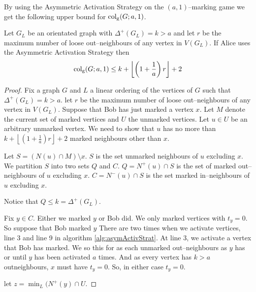     By using the Asymmetric Activation Strategy on the $(a,1)$--marking game we get the following upper bound for $\operatorname{col_g}(G;a,1)$.

\begin{theorem}  %
    Let $G_L$ be an orientated graph with $\Delta^+(G_L)=k>a$ and let $r$ be the maximum number of loose out--neighbours of any vertex in $V(G_L)$. If Alice uses the Asymmetric Activation Strategy then \[\operatorname{col_g}(G;a,1)\leq k+\left\lfloor \left(1+\frac{1}{a}\right)r \right\rfloor +2\]
\end{theorem}

\begin{proof}
%
Fix a graph $G$ and $L$ a linear ordering of the vertices of $G$ such that $\Delta^+(G_L)=k>a$. let $r$ be the maximum number of loose out--neighbours of any vertex in $V(G_L)$. Suppose that Bob has just marked a vertex $x$. Let $M$ denote the current set of marked vertices and $U$ the unmarked vertices. Let $u\in U$ be an arbitrary unmarked vertex. We need to show that $u$ has no more than  $k+\left\lfloor \left(1+\frac{1}{a}\right)r \right\rfloor +2$ marked neighbours other than $x$. 

Let $S=(N(u)\cap M) \setminus {x}$. $S$ is the set unmarked neighbours of $u$ excluding $x$. We partition $S$ into two sets $Q$ and $C$. $Q=N^+(u)\cap S$ is the set of marked out--neighbours of $u$ excluding $x$. $C=N^-(u)\cap S$ is  the set marked in--neighbours of $u$ excluding $x$.

Notice that $Q\leq k = \Delta^+(G_L)$. 

Fix $y\in C$. Either we marked $y$ or Bob did. We only marked vertices with $t_y=0$. So suppose that Bob marked $y$
There are two times when we activate vertices, line 3 and line 9 in algorithm \ref{alg:asymActivStrat}. At line 3, we activate a vertex that Bob has marked. We so this for as each unmarked out--neighbours as $y$ has or until $y$ has been activated $a$ times. And as every vertex has $k>a$ outneighbours, $x$ must have $t_y=0$.
%
So, in either case $t_y=0$.

let $z = \min_{L}(N^+(y)\cap U$. 
\end{proof}
    
    
    




